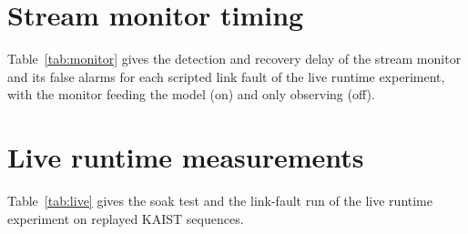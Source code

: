 

\section{Stream monitor timing}
\label{supp:monitor}
Table~\ref{tab:monitor} gives the detection and recovery delay of the stream monitor and its false alarms for each scripted link fault of the live runtime experiment, with the monitor feeding the model (on) and only observing (off).



\section{Live runtime measurements}
\label{supp:live}
Table~\ref{tab:live} gives the soak test and the link-fault run of the live runtime experiment on replayed KAIST sequences.


